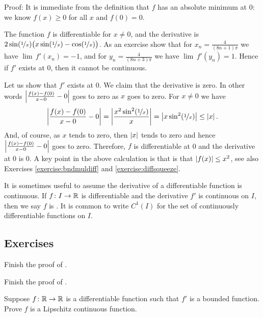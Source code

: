 \begin{example}
Proof: It is immediate from the definition that $f$ has an absolute
minimum at 0: we know $f(x) \geq 0$ for all $x$ and $f(0) = 0$.

The function $f$ is differentiable for $x\not=0$,
and
the derivative 
is $2 \sin (\nicefrac{1}{x}) \bigl( x \sin (\nicefrac{1}{x}) -
\cos(\nicefrac{1}{x}) \bigr)$.
As an exercise show that for $x_n = \frac{4}{(8n+1)\pi}$
we have
$\lim\, f'(x_n) = -1$, and for
$y_n = \frac{4}{(8n+3)\pi}$  we have
$\lim\, f'(y_n) = 1$.  Hence if $f'$ exists at $0$,
then it cannot be continuous.

Let us show that $f'$ exists at 0.  We claim that the derivative is zero.
In other words $\left\lvert {\frac{f(x)-f(0)}{x-0} - 0} \right\rvert$ goes to zero
as $x$ goes to zero.  For $x \not= 0$ we have
\begin{equation*}
\left\lvert {\frac{f(x)-f(0)}{x-0} - 0} \right\rvert
=
\left\lvert {\frac{x^2 \sin^2(\nicefrac{1}{x})}{x}} \right\rvert
=
\left\lvert {x \sin^2(\nicefrac{1}{x})} \right\rvert
\leq
\left\lvert {x} \right\rvert .
\end{equation*}
And, of course, as $x$ tends to zero, then $\left\lvert {x} \right\rvert$ tends to zero and hence
$\left\lvert {\frac{f(x)-f(0)}{x-0} - 0} \right\rvert$ goes to zero.  Therefore, $f$
is differentiable at 0 and the derivative at 0 is 0.
A key point in the above calculation is that 
is that $\left\lvert {f(x)} \right\rvert \leq x^2$,
see also Exercises \ref{exercise:bndmuldiff} and
\ref{exercise:diffsqueeze}.
\end{example}

It is sometimes useful to assume the derivative of a differentiable
function is continuous.  If $f \colon I \to {\mathbb{R}}$ is differentiable and
the derivative $f'$ is continuous on $I$, then we say $f$ is
\emph{}.  It is common to
write $C^1(I)$ for the set of continuously differentiable functions on $I$.

\subsection{Exercises}

\begin{exercise}
Finish the proof of .
\end{exercise}

\begin{exercise}
Finish the proof of .
\end{exercise}

\begin{exercise} \label{exercise:boundeddermeanslip}
Suppose $f \colon {\mathbb{R}} \to {\mathbb{R}}$ is a differentiable
function such that $f'$ is a bounded function.  Prove
$f$ is a Lipschitz continuous function.
\end{exercise}


